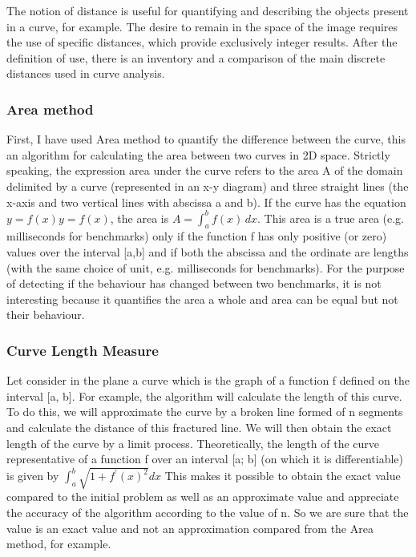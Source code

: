 \documentclass{article}
\begin{document}
The notion of distance is useful for quantifying and describing the objects present in
a curve, for example. The desire to remain in the space of the image requires the use of specific distances, which provide exclusively integer results. After the definition of use, there is an inventory and a comparison of the main discrete distances used in curve analysis.

\subsubsection{Area method}

First, I have used Area \cite{jekel2019similarity} method to quantify the difference between the curve, this an algorithm for calculating the area between two curves in 2D space.
Strictly speaking, the expression area under the curve refers to the area A of the domain delimited by a curve (represented in an x-y diagram) and three straight lines (the x-axis and two vertical lines with abscissa a and b). If the curve has the equation $y=f(x) y=f(x)$, the area is $A=\int _{a}^{b}f(x)\, {d} x$. This area is a true area (e.g. milliseconds for benchmarks) only if the function f has only positive (or zero) values over the interval [a,b] and if both the abscissa and the ordinate are lengths (with the same choice of unit, e.g. milliseconds for benchmarks).
For the purpose of detecting if the behaviour has changed between two benchmarks, it is not interesting because it quantifies the area a whole and area can be equal but not their behaviour.

\subsubsection{Curve Length Measure}


Let consider in the plane a curve \cite{moran1966measuring} which is the graph of a function f defined on the interval [a, b]. For example, the algorithm will calculate the length of this curve. To do this, we will approximate the curve by a broken line formed of n segments and calculate the distance of this fractured line. We will then obtain the exact length of the curve by a limit process.
Theoretically, the length of the curve representative of a function f over an interval [a; b] (on which it is differentiable) is given by $\int_{a}^{b} \sqrt{1+f^{\prime}(x)^{2}} d x$
This makes it possible to obtain the exact value compared to the initial problem as well as an approximate value and appreciate the accuracy of the algorithm according to the value of n. So we are sure that the value is an exact value and not an approximation compared from the Area method, for example.
\end{document}
